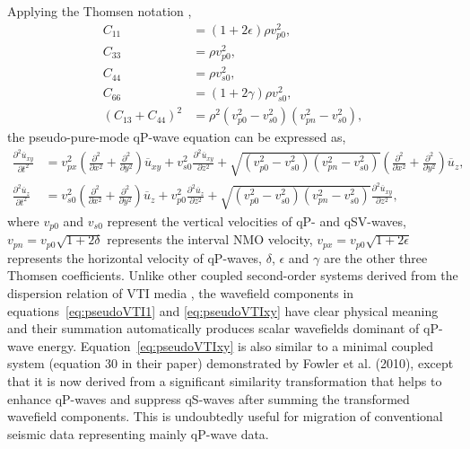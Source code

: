 Applying the Thomsen notation \cite[]{thomsen:1986},
\begin{equation}
\label{eq:ThomsenVTI}
\begin{split}
C_{11} &= (1+2\epsilon)\rho{v_{p0}^2}, \\
C_{33} &= \rho{v_{p0}^2}, \\
C_{44} &= \rho{v_{s0}^2}, \\
C_{66} &= (1+2\gamma)\rho{v_{s0}^2}, \\
(C_{13}+C_{44})^2 &= \rho^2({v_{p0}^2}-{v_{s0}^2})({v_{pn}^2}-{v_{s0}^2}),
\end{split}
\end{equation}
the pseudo-pure-mode qP-wave equation can be expressed as,
\begin{equation}
\label{eq:pseudoVTIxy}
\begin{split}
\frac{\partial^2\overline{u}_{xy}}{\partial t^2} & =
 {v_{px}^2}(\frac{\partial^2}{\partial x^2}+\frac{\partial^2}{\partial y^2}){\overline{u}_{xy}}
+{v_{s0}^2}\frac{\partial^2{\overline{u}_{xy}}}{\partial z^2}
+ \sqrt{({v_{p0}^2}-{v_{s0}^2})({v_{pn}^2}-{v_{s0}^2})}
(\frac{\partial^2}{\partial x^2}+\frac{\partial^2}{\partial y^2}){\overline{u}_z}, \\
\frac{\partial^2\overline{u}_{z}}{\partial t^2} & =
{v_{s0}^2}(\frac{\partial^2}{\partial x^2}+\frac{\partial^2}{\partial y^2}){\overline{u}_{z}}
+ {v_{p0}^2}\frac{\partial^2{\overline{u}_z}}{\partial z^2}
+ \sqrt{({v_{p0}^2}-{v_{s0}^2})({v_{pn}^2}-{v_{s0}^2}) }
  \frac{\partial^2\overline{u}_{xy}}{\partial z^2},
\end{split}
\end{equation}
where $v_{p0}$ and $v_{s0}$ represent the vertical velocities of qP- and qSV-waves,
 $v_{pn} = v_{p0}\sqrt{1+2\delta}$ represents the interval
NMO velocity, $v_{px} = v_{p0}\sqrt{1+2\epsilon}$ 
represents the horizontal velocity of qP-waves,
$\delta$, $\epsilon$ and $\gamma$ are the other three Thomsen coefficients.
 Unlike other coupled second-order systems derived from the dispersion relation 
of VTI media \cite[]{zhou:2006eage}, the wavefield components in
 equations~\ref{eq:pseudoVTI1} and \ref{eq:pseudoVTIxy}
have clear physical meaning and their summation automatically produces scalar wavefields dominant of qP-wave energy.
 Equation~\ref{eq:pseudoVTIxy} is also similar to a minimal coupled system (equation 30 in their paper) 
demonstrated by Fowler
 et al. (2010), except that it is now derived from a significant similarity transformation that helps to
enhance qP-waves and suppress qS-waves after summing the transformed wavefield components. 
 This is undoubtedly useful for migration of conventional seismic data representing mainly qP-wave data.

